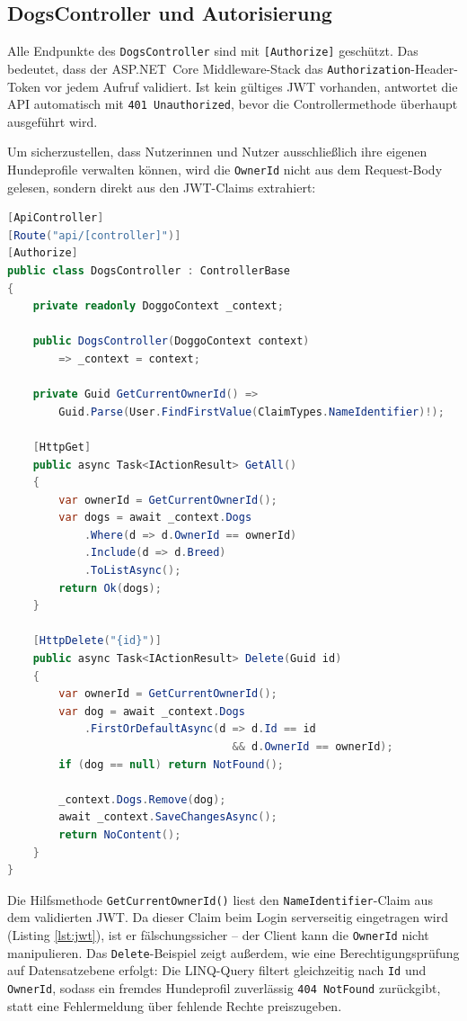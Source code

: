 \subsection{DogsController und Autorisierung}
\label{subsec:dogs-controller}

Alle Endpunkte des \texttt{DogsController} sind mit \texttt{[Authorize]} geschützt. Das
bedeutet, dass der ASP.NET~Core Middleware-Stack das \texttt{Authorization}-Header-Token
vor jedem Aufruf validiert. Ist kein gültiges JWT vorhanden, antwortet die API automatisch
mit \texttt{401~Unauthorized}, bevor die Controllermethode überhaupt ausgeführt wird.

Um sicherzustellen, dass Nutzer\-innen und Nutzer ausschließlich ihre eigenen Hundeprofile
verwalten können, wird die \texttt{OwnerId} nicht aus dem Request-Body gelesen, sondern
direkt aus den JWT-Claims extrahiert:

\begin{lstlisting}[language=csharp, caption={DogsController – OwnerId aus JWT-Claims (Auszug)}, label=lst:dogs-ctrl]
[ApiController]
[Route("api/[controller]")]
[Authorize]
public class DogsController : ControllerBase
{
    private readonly DoggoContext _context;

    public DogsController(DoggoContext context)
        => _context = context;

    private Guid GetCurrentOwnerId() =>
        Guid.Parse(User.FindFirstValue(ClaimTypes.NameIdentifier)!);

    [HttpGet]
    public async Task<IActionResult> GetAll()
    {
        var ownerId = GetCurrentOwnerId();
        var dogs = await _context.Dogs
            .Where(d => d.OwnerId == ownerId)
            .Include(d => d.Breed)
            .ToListAsync();
        return Ok(dogs);
    }

    [HttpDelete("{id}")]
    public async Task<IActionResult> Delete(Guid id)
    {
        var ownerId = GetCurrentOwnerId();
        var dog = await _context.Dogs
            .FirstOrDefaultAsync(d => d.Id == id
                                   && d.OwnerId == ownerId);
        if (dog == null) return NotFound();

        _context.Dogs.Remove(dog);
        await _context.SaveChangesAsync();
        return NoContent();
    }
}
\end{lstlisting}

Die Hilfsmethode \texttt{GetCurrentOwnerId()} liest den \texttt{NameIdentifier}-Claim aus
dem validierten JWT. Da dieser Claim beim Login serverseitig eingetragen wird (Listing
\ref{lst:jwt}), ist er fälschungssicher – der Client kann die \texttt{OwnerId} nicht
manipulieren. Das \texttt{Delete}-Beispiel zeigt außerdem, wie eine
Berechtigungsprüfung auf Datensatzebene erfolgt: Die LINQ-Query filtert gleichzeitig nach
\texttt{Id} und \texttt{OwnerId}, sodass ein fremdes Hundeprofil zuverlässig \texttt{404~NotFound}
zurückgibt, statt eine Fehlermeldung über fehlende Rechte preiszugeben.

